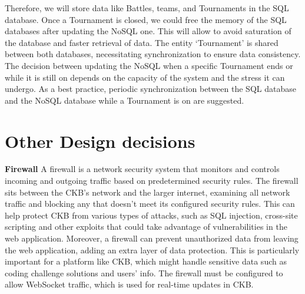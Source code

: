 Therefore, we will store data like Battles, teams, and Tournaments in the SQL database. Once a Tournament is closed, 
we could free the memory of the SQL databases after updating the NoSQL one. This will allow to avoid saturation of the database and faster retrieval of data.\newline
The entity ‘Tournament’ is shared between both databases, necessitating synchronization to ensure data consistency. 
The decision between updating the NoSQL when a specific Tournament ends or while it is still on depends on the capacity of the system and the stress it can undergo. 
As a best practice, periodic synchronization between the SQL database and the NoSQL database while a Tournament is on are suggested.

\section{Other Design decisions}

\textbf{Firewall}\newline
A firewall is a network security system that monitors and controls incoming and outgoing traffic based on predetermined security rules. 
The firewall sits between the CKB’s network and the larger internet, examining all network traffic and blocking any 
that doesn’t meet its configured security rules. This can help protect CKB from various types of attacks, 
such as SQL injection, cross-site scripting and other exploits that could take advantage of vulnerabilities in the web application. 
Moreover, a firewall can prevent unauthorized data from leaving the web application, adding an extra layer of data protection. 
This is particularly important for a platform like CKB, which might handle sensitive data such as coding challenge solutions and users’ info. 
The firewall must be configured to allow WebSocket traffic, which is used for real-time updates in CKB.

